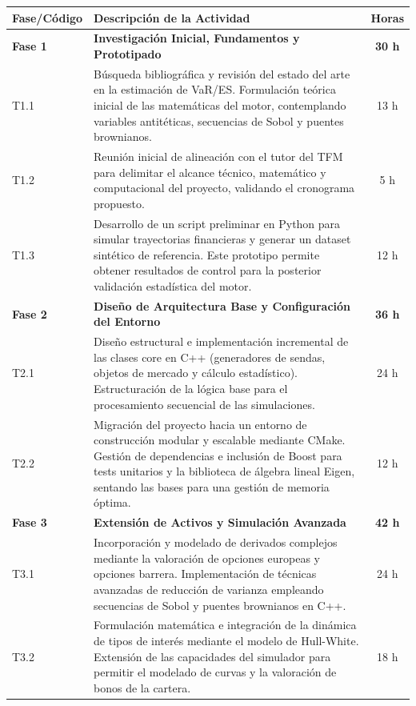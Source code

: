 \documentclass[11pt]{article}
\begin{document}
\begin{table}[h]
\centering
\small
\begin{tabular}{|l|p{11cm}|c|}
\hline
\textbf{Fase/Código} & \textbf{Descripción de la Actividad} & \textbf{Horas} \\ \hline
\textbf{Fase 1} & \textbf{Investigación Inicial, Fundamentos y Prototipado} & \textbf{30 h} \\ \hline
T1.1 & Búsqueda bibliográfica y revisión del estado del arte en la estimación de VaR/ES. Formulación teórica inicial de las matemáticas del motor, contemplando variables antitéticas, secuencias de Sobol y puentes brownianos. & 13 h \\ \hline
T1.2 & Reunión inicial de alineación con el tutor del TFM para delimitar el alcance técnico, matemático y computacional del proyecto, validando el cronograma propuesto. & 5 h \\ \hline
T1.3 & Desarrollo de un script preliminar en Python para simular trayectorias financieras y generar un dataset sintético de referencia. Este prototipo permite obtener resultados de control para la posterior validación estadística del motor. & 12 h \\ \hline
\textbf{Fase 2} & \textbf{Diseño de Arquitectura Base y Configuración del Entorno} & \textbf{36 h} \\ \hline
T2.1 & Diseño estructural e implementación incremental de las clases core en C++ (generadores de sendas, objetos de mercado y cálculo estadístico). Estructuración de la lógica base para el procesamiento secuencial de las simulaciones. & 24 h \\ \hline
T2.2 & Migración del proyecto hacia un entorno de construcción modular y escalable mediante CMake. Gestión de dependencias e inclusión de Boost para tests unitarios y la biblioteca de álgebra lineal Eigen, sentando las bases para una gestión de memoria óptima. & 12 h \\ \hline
\textbf{Fase 3} & \textbf{Extensión de Activos y Simulación Avanzada} & \textbf{42 h} \\ \hline
T3.1 & Incorporación y modelado de derivados complejos mediante la valoración de opciones europeas y opciones barrera. Implementación de técnicas avanzadas de reducción de varianza empleando secuencias de Sobol y puentes brownianos en C++. & 24 h \\ \hline
T3.2 & Formulación matemática e integración de la dinámica de tipos de interés mediante el modelo de Hull-White. Extensión de las capacidades del simulador para permitir el modelado de curvas y la valoración de bonos de la cartera. & 18 h \\ \hline

\end{tabular}
\end{table}
\end{document}
